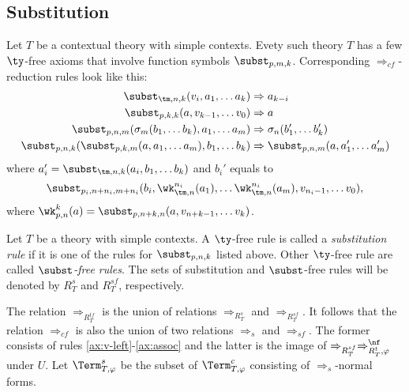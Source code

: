 \subsection{Substitution}
\label{sec:subst}

Let $T$ be a contextual theory with simple contexts.
Evety such theory $T$ has a few $\ty$-free axioms that involve function symbols $\subst_{p,m,k}$.
Corresponding $\Rightarrow_{cf}$-reduction rules look like this:
\begin{align}
\subst_{\tm,n,k}(v_i, a_1, \ldots a_k) & \Rightarrow a_{k-i} \label{ax:v-left} \\
\subst_{p,k,k}(a, v_{k-1}, \ldots v_0) & \Rightarrow a \label{ax:v-right} \\
\subst_{p,n,m}(\sigma_m(b_1, \ldots b_k), a_1, \ldots a_m) & \Rightarrow \sigma_n(b_1', \ldots b_k') \label{ax:sigma} \\
\subst_{p,n,k}(\subst_{p,k,m}(a, a_1, \ldots a_m), b_1, \ldots b_k) & \Rightarrow \subst_{p,n,m}(a, a_1', \ldots a_m') \label{ax:assoc}
\end{align}
where $a_i' = \subst_{\tm,n,k}(a_i, b_1, \ldots b_k)$ and $b_i'$ equals to
\[ \subst_{p_i,n+n_i,m+n_i}(b_i, \wk^{n_i}_{\tm,n}(a_1), \ldots \wk^{n_i}_{\tm,n}(a_m), v_{n_i-1}, \ldots v_0), \]
where $\wk^k_{p,n}(a) = \subst_{p,n+k,n}(a, v_{n+k-1}, \ldots v_k)$.

Let $T$ be a theory with simple contexts.
A $\ty$-free rule is called a \emph{substitution rule} if it is one of the rules for $\subst_{p,n,k}$ listed above.
Other $\ty$-free rule are called \emph{$\subst$-free rules}.
The sets of substitution and $\subst$-free rules will be denoted by $R^s_T$ and $R^{sf}_T$, respectively.

The relation $\Rightarrow_{R_T^{tf}}$ is the union of relations $\Rightarrow_{R_T^s}$ and $\Rightarrow_{R_T^{sf}}$.
It follows that the relation $\Rightarrow_{cf}$ is also the union of two relations $\Rightarrow_s$ and $\Rightarrow_{sf}$.
The former consists of rules \eqref{ax:v-left}-\eqref{ax:assoc} and the latter is the image of $\Rightarrow_{R_T^{sf}} \Rightarrow_{R_T^t,\varphi}^\nf$ under $U$.
Let $\Term_{T,\varphi}^s$ be the subset of $\Term_{T,\varphi}^c$ consisting of $\Rightarrow_s$-normal forms.

